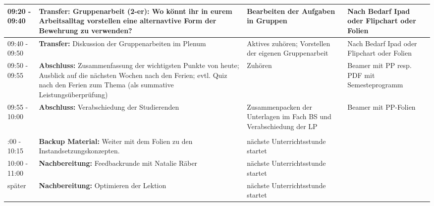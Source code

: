 \documentclass[
11pt,
captions=tableheading,
headsepline,
footsepline, 
captions=tableheading,
parskip=half-,
]{scrartcl}
\begin{document}
\begin{landscape}
\begin{longtable}{@{}l|p{9cm}p{7.5cm}p{3.5cm}@{}}
    \midrule
    09:20 - 09:40 & \textbf{Transfer:} Gruppenarbeit (2-er): Wo könnt ihr in eurem Arbeitsalltag vorstellen eine alternavtive Form der Bewehrung zu verwenden? & Bearbeiten der Aufgaben in Gruppen & Nach Bedarf Ipad oder Flipchart oder Folien\\
    \midrule
    09:40 - 09:50 & \textbf{Transfer:} Diskussion der Gruppenarbeiten im Plenum  & Aktives zuhören; Vorstellen der eigenen Gruppenarbeit & Nach Bedarf Ipad oder Flipchart oder Folien\\
    \midrule
    09:50 - 09:55 & \textbf{Abschluss:} Zusammenfassung der wichtigsten Punkte von heute; Ausblick auf die nächsten Wochen nach den Ferien; evtl. Quiz nach den Ferien zum Thema (als summative Leistungsüberprüfung)& Zuhören & Beamer mit PP resp. PDF mit Semesteprogramm\\
    \midrule
    09:55 - 10:00 & \textbf{Abschluss:} Verabschiedung der Studierenden & Zusammenpacken der Unterlagen im Fach BS und Verabschiedung der LP & Beamer mit PP-Folien\\
    \midrule
    \\ \addlinespace
    \midrule
    10:00 - 10:15 & \textbf{Backup Material:} Weiter mit dem Folien zu den Instandsetzungskonzepten. & nächste Unterrichtsstunde startet & {}\\
    \hline
    10:00 - 11:00 & \textbf{Nachbereitung:} Feedbackrunde mit Natalie Räber & nächste Unterrichtsstunde startet & {}\\
    \hline
    später & \textbf{Nachbereitung:} Optimieren der Lektion & nächste Unterrichtsstunde startet & {}\\
    \bottomrule
\end{longtable}
\end{landscape}
\clearpage
\end{document}
